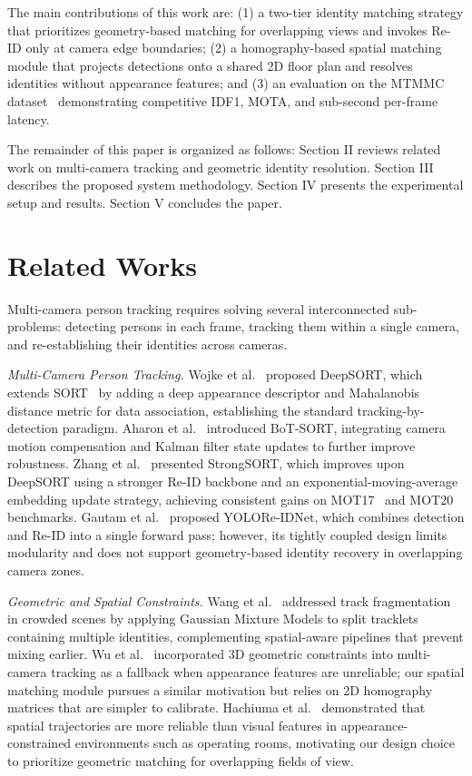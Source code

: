 \documentclass[conference]{IEEEtran}
\begin{document}
The main contributions of this work are: (1) a two-tier identity matching strategy that prioritizes geometry-based matching for overlapping views and invokes Re-ID only at camera edge boundaries; (2) a homography-based spatial matching module that projects detections onto a shared 2D floor plan and resolves identities without appearance features; and (3) an evaluation on the MTMMC dataset~\cite{mtmmc} demonstrating competitive IDF1, MOTA, and sub-second per-frame latency.

The remainder of this paper is organized as follows: Section II reviews related work on multi-camera tracking and geometric identity resolution. Section III describes the proposed system methodology. Section IV presents the experimental setup and results. Section V concludes the paper.



\section{Related Works}
\label{sec:related-works}

Multi-camera person tracking requires solving several interconnected sub-problems: detecting persons in each frame, tracking them within a single camera, and re-establishing their identities across cameras.

\textit{Multi-Camera Person Tracking.}
Wojke et al.~\cite{deepsort} proposed DeepSORT, which extends SORT~\cite{sort} by adding a deep appearance descriptor and Mahalanobis distance metric for data association, establishing the standard tracking-by-detection paradigm. Aharon et al.~\cite{botsort} introduced BoT-SORT, integrating camera motion compensation and Kalman filter state updates to further improve robustness. Zhang et al.~\cite{strongsort} presented StrongSORT, which improves upon DeepSORT using a stronger Re-ID backbone and an exponential-moving-average embedding update strategy, achieving consistent gains on MOT17~\cite{mot17} and MOT20 benchmarks. Gautam et al.~\cite{yoloreidnet} proposed YOLORe-IDNet, which combines detection and Re-ID into a single forward pass; however, its tightly coupled design limits modularity and does not support geometry-based identity recovery in overlapping camera zones.

\textit{Geometric and Spatial Constraints.}
Wang et al.~\cite{mixed_syn_tracking} addressed track fragmentation in crowded scenes by applying Gaussian Mixture Models to split tracklets containing multiple identities, complementing spatial-aware pipelines that prevent mixing earlier. Wu et al.~\cite{geom_consist_tracking} incorporated 3D geometric constraints into multi-camera tracking as a fallback when appearance features are unreliable; our spatial matching module pursues a similar motivation but relies on 2D homography matrices that are simpler to calibrate. Hachiuma et al.~\cite{hospital_tracking} demonstrated that spatial trajectories are more reliable than visual features in appearance-constrained environments such as operating rooms, motivating our design choice to prioritize geometric matching for overlapping fields of view.
\end{document}
